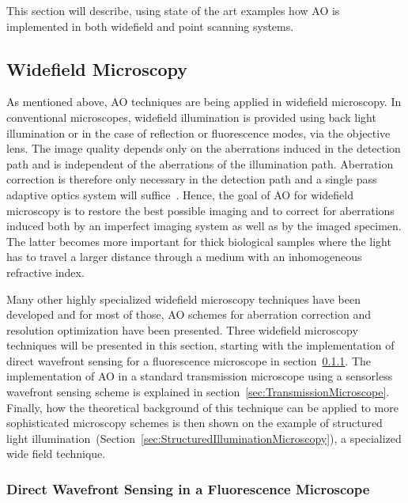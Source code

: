 This section will describe, using state of the art examples how AO is implemented in both widefield and point scanning systems.  

\subsection{Widefield Microscopy}
\label{sec:WidefieldMicroscopy}

As mentioned above, AO techniques are being applied in widefield microscopy. In conventional microscopes, widefield illumination is provided using back light illumination or in the case of reflection or fluorescence modes, via the objective lens. The image quality depends only on the aberrations induced in the detection path and is independent of the aberrations of the illumination path. Aberration correction is therefore only necessary in the detection path and a single pass adaptive optics system will suffice~\cite{book_aberrations}. Hence, the goal of AO for widefield microscopy is to restore the best possible imaging and to correct for aberrations induced both by an imperfect imaging system as well as by the imaged specimen. The latter becomes more important for thick biological samples where the light has to travel a larger distance through a medium with an inhomogeneous refractive index. 

Many other highly specialized widefield microscopy techniques have been developed and for most of those, AO schemes for aberration correction and resolution optimization have been presented. Three widefield microscopy techniques will be presented in this section, starting with the implementation of direct wavefront sensing for a fluorescence microscope in section~\ref{sec:DirectFluorescenceMicroscope}. The implementation of AO in a standard transmission microscope using a sensorless wavefront sensing scheme is explained in section~\ref{sec:TransmissionMicroscope}. Finally, how the theoretical background of this technique can be applied to more sophisticated microscopy schemes is then shown on the example of structured light illumination~(Section~\ref{sec:StructuredIlluminationMicroscopy}), a specialized wide field technique. 

\subsubsection{Direct Wavefront Sensing in a Fluorescence Microscope}
\label{sec:DirectFluorescenceMicroscope}

